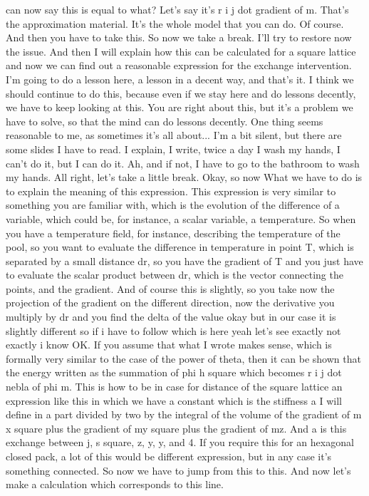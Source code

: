 can now say this is equal to what? Let's say it's r i j dot gradient of m. That's the approximation material. It's the whole model that you can do. Of course. And then you have to take this. So now we take a break. I'll try to restore now the issue. And then I will explain how this can be calculated for a square lattice and now we can find out a reasonable expression for the exchange intervention. I'm going to do a lesson here, a lesson in a decent way, and that's it. I think we should continue to do this, because even if we stay here and do lessons decently, we have to keep looking at this. You are right about this, but it's a problem we have to solve, so that the mind can do lessons decently. One thing seems reasonable to me, as sometimes it's all about... I'm a bit silent, but there are some slides I have to read. I explain, I write, twice a day I wash my hands, I can't do it, but I can do it. Ah, and if not, I have to go to the bathroom to wash my hands. All right, let's take a little break. Okay, so now What we have to do is to explain the meaning of this expression. This expression is very similar to something you are familiar with, which is the evolution of the difference of a variable, which could be, for instance, a scalar variable, a temperature. So when you have a temperature field, for instance, describing the temperature of the pool, so you want to evaluate the difference in temperature in point T, which is separated by a small distance dr, so you have the gradient of T and you just have to evaluate the scalar product between dr, which is the vector connecting the points, and the gradient. And of course this is slightly, so you take now the projection of the gradient on the different direction, now the derivative you multiply by dr and you find the delta of the value okay but in our case it is slightly different so if i have to follow which is here yeah let's see exactly not exactly i know OK. If you assume that what I wrote makes sense, which is formally very similar to the case of the power of theta, then it can be shown that the energy written as the summation of phi h square which becomes r i j dot nebla of phi m. This is how to be in case for distance of the square lattice an expression like this in which we have a constant which is the stiffness a I will define in a part divided by two by the integral of the volume of the gradient of m x square plus the gradient of my square plus the gradient of mz. And a is this exchange between j, s square, z, y, y, and 4. If you require this for an hexagonal closed pack, a lot of this would be different expression, but in any case it's something connected. So now we have to jump from this to this. And now let's make a calculation which corresponds to this line.
